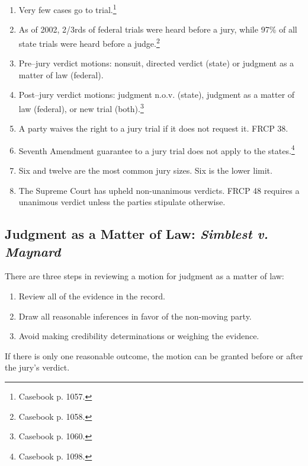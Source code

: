 \begin{enumerate}
    \item Very few cases go to trial.\footnote{Casebook p. 1057.}
    \item As of 2002, 2/3rds of federal trials were heard before a jury, while 
    97\% of all state trials were heard before a judge.\footnote{Casebook p. 
    1058.}
    \item Pre--jury verdict motions: nonsuit, directed verdict (state) or 
    judgment as a matter of law (federal).
    \item Post--jury verdict motions: judgment n.o.v. (state), judgment as a 
    matter of law (federal), or new trial (both).\footnote{Casebook p. 1060.}
    \item A party waives the right to a jury trial if it does not request it. 
    FRCP 38.
    \item Seventh Amendment guarantee to a jury trial does not apply to the 
    states.\footnote{Casebook p. 1098.}
    \item Six and twelve are the most common jury sizes. Six is the lower 
    limit.
    \item The Supreme Court has upheld non-unanimous verdicts. FRCP 48 
    requires a unanimous verdict unless the parties stipulate otherwise.
\end{enumerate}

\subsection{Judgment as a Matter of Law: \emph{Simblest v. Maynard}}

There are three steps in reviewing a motion for  judgment as a matter of law:

\begin{enumerate}
    \item Review all of the evidence in the record. 
    \item Draw all reasonable inferences in favor of the non-moving party.
    \item Avoid making credibility determinations or weighing the evidence.
\end{enumerate}

If there is only one reasonable outcome, the motion can be granted before or 
after the jury's verdict.

